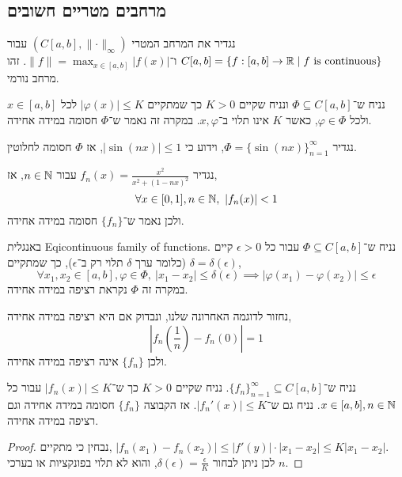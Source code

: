 \subsection{מרחבים מטריים חשובים}
\begin{definition}
	נגדיר את המרחב המטרי $(C[a, b], \lVert \cdot \rVert_\infty)$ עבור $C[a, b] = \{ f : [a, b] \to \mathbb{R} \mid f \text{ is continuous} \}$ ו־$\lVert f \rVert = \max_{x \in [a, b]} |f(x)|$.
	זהו מרחב נורמי.
\end{definition}
\begin{definition}
	נניח ש־$\Phi \subseteq C[a, b]$ ונניח שקיים $K > 0$ כך שמתקיים $|\varphi(x)| \le K$ לכל $x \in [a, b]$ ולכל $\varphi \in \Phi$, כאשר $K$ אינו תלוי ב־$x, \varphi$.
	במקרה זה נאמר ש־$\Phi$ חסומה במידה אחידה.
\end{definition}
\begin{example}
	נגדיר $\Phi = {\{ \sin(nx) \}}_{n = 1}^\infty$, וידוע כי $|\sin(nx)| \le 1$, אז $\Phi$ חסומה לחלוטין.
\end{example}
\begin{example}
	נגדיר $f_n(x) = \frac{x^2}{x^2 + {(1 - nx)}^2}$ עבור $n \in \mathbb{N}$, אז,
	\[
		\forall x \in [0, 1], n \in \mathbb{N},\ |f_n(x)| < 1
	\]
	ולכן נאמר ש־$\{ f_n \}$ חסומה במידה אחידה.
\end{example}
\begin{definition}
	באנגלית Eqicontinuous family of functions.
	נניח ש־$\Phi \subseteq C[a, b]$ עבור כל $\epsilon > 0$ קיים $\delta = \delta(\epsilon)$ (כלומר ערך $\delta$ תלוי רק ב־$\epsilon$), כך שמתקיים,
	\[
		\forall x_1, x_2 \in [a, b], \varphi \in \Phi,\ 
		|x_1 - x_2| \le \delta(\epsilon)
		\implies |\varphi(x_1) - \varphi(x_2)| \le \epsilon
	\]
	במקרה זה $\Phi$ נקראת רציפה במידה אחידה.
\end{definition}
\begin{example}
	נחזור לדוגמה האחרונה שלנו, ונבדוק אם היא רציפה במידה אחידה,
	\[
		|f_n(\frac{1}{n}) - f_n(0)| = 1
	\]
	ולכן $\{ f_n \}$ אינה רציפה במידה אחידה.
\end{example}
\begin{proposition}
	נניח ש־${\{ f_n \}}_{n = 1}^\infty \subseteq C[a, b]$.
	נניח שקיים $K > 0$ כך ש־$|f_n(x)| \le K$ עבור כל $x \in [a, b], n \in \mathbb{N}$.
	נניח גם ש־$|f_n'(x)| \le K$.
	אז הקבוצה $\{ f_n \}$ חסומה במידה אחידה וגם רציפה במידה אחידה.
\end{proposition}
\begin{proof}
	נבחין כי מתקיים, $|f_n(x_1) - f_n(x_2)| \le |f'(y)| \cdot |x_1 - x_2| \le K |x_1 - x_2|$. \\
	לכן ניתן לבחור $\delta(\epsilon) = \frac{\epsilon}{K}$, והוא לא תלוי בפונקציות או בערכי $n$.
\end{proof}

